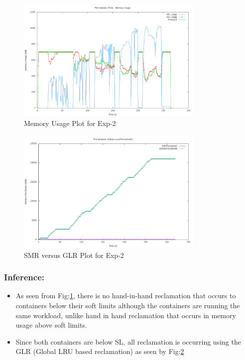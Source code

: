      \begin{figure}
	\centering
	\includegraphics[width=0.8\textwidth]{images/experimentation/global_lru/no_sl_mu.png}
	\caption{Memory Usage Plot for Exp-2}
	\label{img_no_sl_mu}
      \end{figure}
      
      \begin{figure}
	\centering
	\includegraphics[width=0.8\textwidth]{images/experimentation/global_lru/no_sl_global_vs_local.png}
	\caption{SMR versus GLR Plot for Exp-2}
	\label{img_no_sl_global_vs_local}
      \end{figure}
      
      \subsubsection{Inference:}
	\begin{itemize}
	  \item As seen from Fig:\ref{img_no_sl_mu}, there is no hand-in-hand reclamation that occurs to containers below their soft 
limits although the containers are running the same workload, unlike hand in hand reclamation that occurs in memory usage above soft limits.
	  \item Since both containers are below SL, all reclamation is occurring using the GLR (Global LRU based reclamation) as seen by 
Fig:\ref{img_no_sl_global_vs_local}
	\end{itemize}

